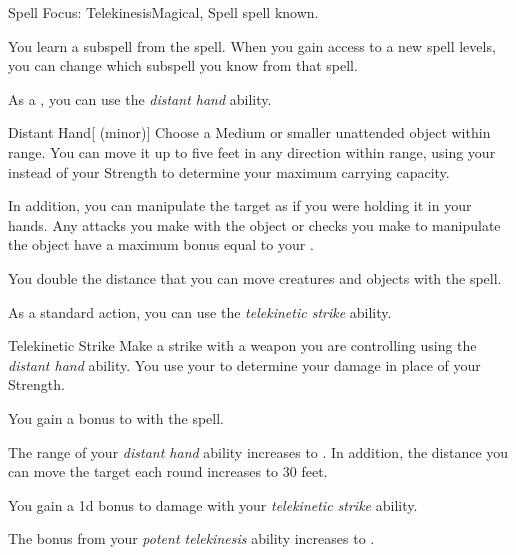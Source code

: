    \begin{feat}{Spell Focus: Telekinesis}{Magical, Spell}
        \featpre {} spell known.

         You learn a subspell from the  spell.
        When you gain access to a new spell levels, you can change which subspell you know from that spell.

         As a , you can use the \textit{distant hand} ability.
        \begin{ability}{Distant Hand}[ (minor)]
            Choose a Medium or smaller unattended object within \rngclose range.
            You can move it up to five feet in any direction within range, using your  instead of your Strength to determine your maximum carrying capacity.

            In addition, you can manipulate the target as if you were holding it in your hands.
            Any attacks you make with the object or checks you make to manipulate the object have a maximum bonus equal to your .
        \end{ability}

         You double the distance that you can move creatures and objects with the  spell.

         As a standard action, you can use the \textit{telekinetic strike} ability.
        \begin{ability}{Telekinetic Strike}
            Make a strike with a weapon you are controlling using the \textit{distant hand} ability.
            You use your  to determine your damage in place of your Strength.
        \end{ability}

         You gain a  bonus to  with the  spell. 

         The range of your \textit{distant hand} ability increases to \rngmed.
        In addition, the distance you can move the target each round increases to 30 feet.

         You gain a \plus1d bonus to damage with your \textit{telekinetic strike} ability.

         The bonus from your \textit{potent telekinesis} ability increases to .
    \end{feat}

